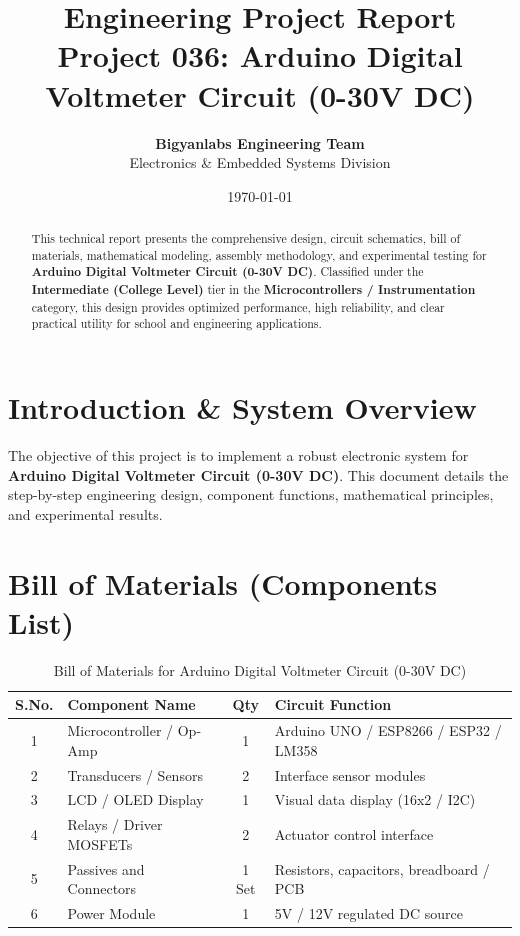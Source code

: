 \documentclass[11pt,a4paper]{article}
\title{\textbf{\Huge Engineering Project Report}\\[0.5em] \Large Project 036: Arduino Digital Voltmeter Circuit (0-30V DC)}
\author{\textbf{Bigyanlabs Engineering Team}\\ Electronics \& Embedded Systems Division}
\date{\today}
\begin{document}
\maketitle
\thispagestyle{empty}

\begin{abstract}
This technical report presents the comprehensive design, circuit schematics, bill of materials, mathematical modeling, assembly methodology, and experimental testing for \textbf{Arduino Digital Voltmeter Circuit (0-30V DC)}. Classified under the \textbf{Intermediate (College Level)} tier in the \textbf{Microcontrollers / Instrumentation} category, this design provides optimized performance, high reliability, and clear practical utility for school and engineering applications.
\end{abstract}

\newpage
\tableofcontents
\newpage

\section{Introduction \& System Overview}
The objective of this project is to implement a robust electronic system for \textbf{Arduino Digital Voltmeter Circuit (0-30V DC)}. This document details the step-by-step engineering design, component functions, mathematical principles, and experimental results.

\section{Bill of Materials (Components List)}
\begin{table}[h!]
\centering
\caption{Bill of Materials for Arduino Digital Voltmeter Circuit (0-30V DC)}
\vspace{0.5em}
\begin{tabular}{clcp{7cm}}
\toprule
\textbf{S.No.} & \textbf{Component Name} & \textbf{Qty} & \textbf{Circuit Function} \\
\midrule
1 & Microcontroller / Op-Amp & 1 & Arduino UNO / ESP8266 / ESP32 / LM358 \\
2 & Transducers / Sensors & 2 & Interface sensor modules \\
3 & LCD / OLED Display & 1 & Visual data display (16x2 / I2C) \\
4 & Relays / Driver MOSFETs & 2 & Actuator control interface \\
5 & Passives and Connectors & 1 Set & Resistors, capacitors, breadboard / PCB \\
6 & Power Module & 1 & 5V / 12V regulated DC source \\
\bottomrule
\end{tabular}
\end{table}
\end{document}
